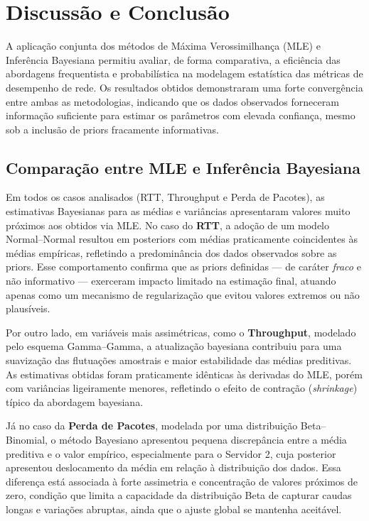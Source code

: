 \documentclass{article}
\begin{document}
\section{Discussão e Conclusão}

A aplicação conjunta dos métodos de Máxima Verossimilhança (MLE) e Inferência Bayesiana
permitiu avaliar, de forma comparativa, a eficiência das abordagens frequentista e probabilística
na modelagem estatística das métricas de desempenho de rede.
Os resultados obtidos demonstraram uma forte convergência entre ambas as metodologias,
indicando que os dados observados forneceram informação suficiente para estimar os parâmetros
com elevada confiança, mesmo sob a inclusão de priors fracamente informativas.

\subsection{Comparação entre MLE e Inferência Bayesiana}

Em todos os casos analisados (RTT, Throughput e Perda de Pacotes), as estimativas Bayesianas
para as médias e variâncias apresentaram valores muito próximos aos obtidos via MLE.
No caso do \textbf{RTT}, a adoção de um modelo Normal–Normal resultou em posteriors
com médias praticamente coincidentes às médias empíricas, refletindo a predominância dos
dados observados sobre as priors.  
Esse comportamento confirma que as priors definidas — de caráter \textit{fraco} e
não informativo — exerceram impacto limitado na estimação final, atuando apenas como um
mecanismo de regularização que evitou valores extremos ou não plausíveis.

Por outro lado, em variáveis mais assimétricas, como o \textbf{Throughput},
modelado pelo esquema Gamma–Gamma, a atualização bayesiana contribuiu para uma suavização
das flutuações amostrais e maior estabilidade das médias preditivas.
As estimativas obtidas foram praticamente idênticas às derivadas do MLE,
porém com variâncias ligeiramente menores, refletindo o efeito de contração (\textit{shrinkage})
típico da abordagem bayesiana.

Já no caso da \textbf{Perda de Pacotes}, modelada por uma distribuição Beta–Binomial,
o método Bayesiano apresentou pequena discrepância entre a média preditiva e o valor empírico,
especialmente para o Servidor 2, cuja posterior apresentou deslocamento da média em relação
à distribuição dos dados. Essa diferença está associada à forte assimetria e concentração
de valores próximos de zero, condição que limita a capacidade da distribuição Beta de capturar
caudas longas e variações abruptas, ainda que o ajuste global se mantenha aceitável.
\end{document}
